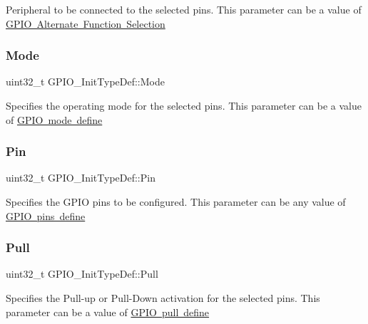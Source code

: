 Peripheral to be connected to the selected pins. This parameter can be a value of \mbox{\hyperlink{group___g_p_i_o___alternate__function__selection}{G\+P\+IO Alternate Function Selection}} \mbox{\label{struct_g_p_i_o___init_type_def_a3731d84343e65a98fdf51056a8d30321}} 
\subsubsection{\texorpdfstring{Mode}{Mode}}
{\footnotesize\ttfamily uint32\+\_\+t G\+P\+I\+O\+\_\+\+Init\+Type\+Def\+::\+Mode}

Specifies the operating mode for the selected pins. This parameter can be a value of \mbox{\hyperlink{group___g_p_i_o__mode__define}{G\+P\+IO mode define}} \mbox{\label{struct_g_p_i_o___init_type_def_aa807fb62b2b2cf937092abba81370b87}} 
\subsubsection{\texorpdfstring{Pin}{Pin}}
{\footnotesize\ttfamily uint32\+\_\+t G\+P\+I\+O\+\_\+\+Init\+Type\+Def\+::\+Pin}

Specifies the G\+P\+IO pins to be configured. This parameter can be any value of \mbox{\hyperlink{group___g_p_i_o__pins__define}{G\+P\+IO pins define}} \mbox{\label{struct_g_p_i_o___init_type_def_aa2d3a6b0c4e10ac20882b4a37799ced1}} 
\subsubsection{\texorpdfstring{Pull}{Pull}}
{\footnotesize\ttfamily uint32\+\_\+t G\+P\+I\+O\+\_\+\+Init\+Type\+Def\+::\+Pull}

Specifies the Pull-\/up or Pull-\/\+Down activation for the selected pins. This parameter can be a value of \mbox{\hyperlink{group___g_p_i_o__pull__define}{G\+P\+IO pull define}} \mbox{\label{struct_g_p_i_o___init_type_def_aae3b8ba407fb4f974cbce9cc03fc189d}} 
